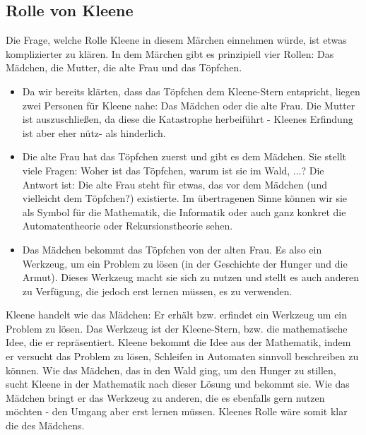 \documentclass{article}
\begin{document}
\subsection*{Rolle von Kleene}
Die Frage, welche Rolle Kleene in diesem Märchen einnehmen würde, ist etwas komplizierter zu klären. In dem Märchen gibt es prinzipiell vier Rollen: Das Mädchen, die Mutter, die alte Frau und das Töpfchen. 
\begin{itemize}
	\item Da wir bereits klärten, dass das Töpfchen dem Kleene-Stern entspricht, liegen zwei Personen für Kleene nahe: Das Mädchen oder die alte Frau. Die Mutter ist auszuschließen, da diese die Katastrophe herbeiführt - Kleenes Erfindung ist aber eher nütz- als hinderlich.
  \item Die alte Frau hat das Töpfchen zuerst und gibt es dem Mädchen. Sie stellt viele Fragen: Woher ist das Töpfchen, warum ist sie im Wald, ...? Die Antwort ist: Die alte Frau steht für etwas, das vor dem Mädchen (und vielleicht dem Töpfchen?) existierte. Im übertragenen Sinne können wir sie als Symbol für die Mathematik, die Informatik oder auch ganz konkret die Automatentheorie oder Rekursionstheorie sehen. 
  \item Das Mädchen bekommt das Töpfchen von der alten Frau. Es also ein Werkzeug, um ein Problem zu lösen (in der Geschichte der Hunger und die Armut). Dieses Werkzeug macht sie sich zu nutzen und stellt es auch anderen zu Verfügung, die jedoch erst lernen müssen, es zu verwenden. 
\end{itemize}

Kleene handelt wie das Mädchen: Er erhält bzw. erfindet ein Werkzeug um ein Problem zu lösen. Das Werkzeug ist der Kleene-Stern, bzw. die mathematische Idee, die er repräsentiert. Kleene bekommt die Idee aus der Mathematik, indem er versucht das Problem zu lösen, Schleifen in Automaten sinnvoll beschreiben zu können. Wie das Mädchen, das in den Wald ging, um den Hunger zu stillen, sucht Kleene in der Mathematik nach dieser Lösung und bekommt sie. Wie das Mädchen bringt er das Werkzeug zu anderen, die es ebenfalls gern nutzen möchten - den Umgang aber erst lernen müssen. Kleenes Rolle wäre somit klar die des Mädchens.
\end{document}
